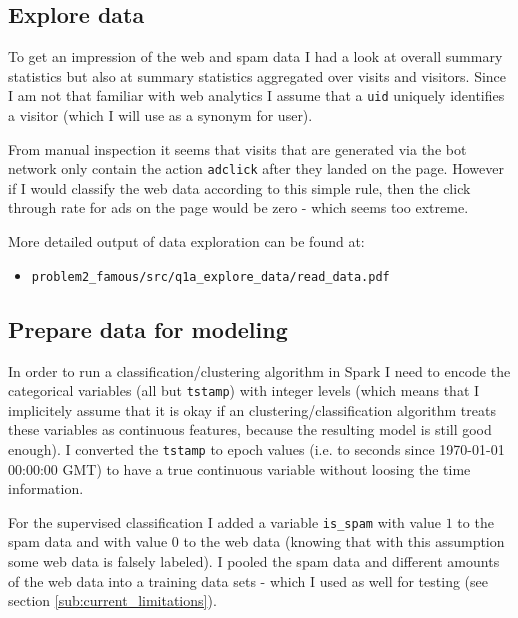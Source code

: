 \documentclass{article}\usepackage[]{graphicx}\usepackage[]{color}
\begin{document}


\subsection{Explore data} %
\label{sub:explore_data}
To get an impression of the web and spam data I had a look at overall summary statistics but also at summary statistics aggregated over visits and visitors. Since I am not that familiar with web analytics I assume that a \verb+uid+ uniquely identifies a visitor (which I will use as a synonym for user). 

From manual inspection it seems that visits that are generated via the bot network only contain the action \verb+adclick+ after they landed on the page. However if I would classify the web data according to this simple rule, then the click through rate for ads on the page would be zero - which seems too extreme.

\bigskip
More detailed output of data exploration can be found at:
\begin{itemize}
	\item \verb+problem2_famous/src/q1a_explore_data/read_data.pdf+
\end{itemize}


\subsection{Prepare data for modeling} %
\label{sub:prepare_data_for_modeling}
In order to run a classification/clustering algorithm in Spark I need to encode the categorical variables (all but \verb+tstamp+) with integer levels (which means that I implicitely assume that it is okay if an clustering/classification algorithm treats these variables as continuous features, because the resulting model is still good enough).
I converted the \verb+tstamp+ to epoch values (i.e. to seconds since 1970-01-01 00:00:00 GMT) to have a true continuous variable without loosing the time information.

For the supervised classification I added a variable \verb+is_spam+ with value $1$ to the spam data and with value 0 to the web data (knowing that with this assumption some web data is falsely labeled). I pooled the spam data and different amounts of the web data into a training data sets - which I used as well for testing (see section \ref{sub:current_limitations}).
\end{document}
